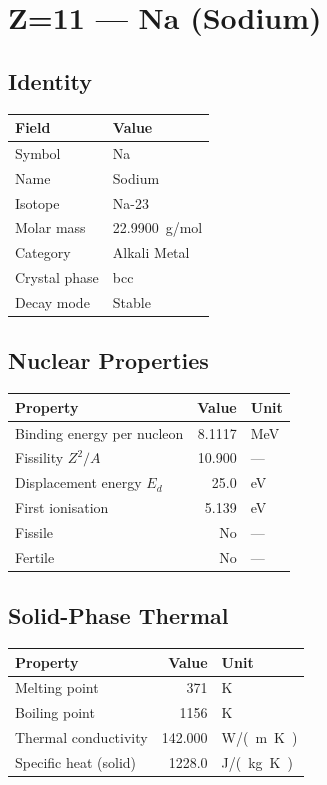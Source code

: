 \documentclass[11pt,a4paper]{article}
\begin{document}
\newpage

\section{Z=11 --- Na (Sodium)}
\label{sec:Z11}

\subsection{Identity}
\begin{tabular}{ll}
  \toprule
  Field & Value \\
  \midrule
  Symbol & Na \\
  Name & Sodium \\
  Isotope & Na-23 \\
  Molar mass & \SI{22.9900}{g/mol} \\
  Category & Alkali Metal \\
  Crystal phase & bcc \\
  Decay mode & Stable \\
  \bottomrule
\end{tabular}

\subsection{Nuclear Properties}
\begin{tabular}{lrl}
  \toprule
  Property & Value & Unit \\
  \midrule
  Binding energy per nucleon & 8.1117 & \si{MeV} \\
  Fissility $Z^2/A$ & 10.900 & --- \\
  Displacement energy $E_d$ & 25.0 & \si{eV} \\
  First ionisation & 5.139 & \si{eV} \\
  Fissile & No & --- \\
  Fertile & No & --- \\
  \bottomrule
\end{tabular}

\subsection{Solid-Phase Thermal}
\begin{tabular}{lrl}
  \toprule
  Property & Value & Unit \\
  \midrule
  Melting point & 371 & \si{K} \\
  Boiling point & 1156 & \si{K} \\
  Thermal conductivity & 142.000 & \si{W/(m.K)} \\
  Specific heat (solid) & 1228.0 & \si{J/(kg.K)} \\
  \bottomrule
\end{tabular}
\end{document}
